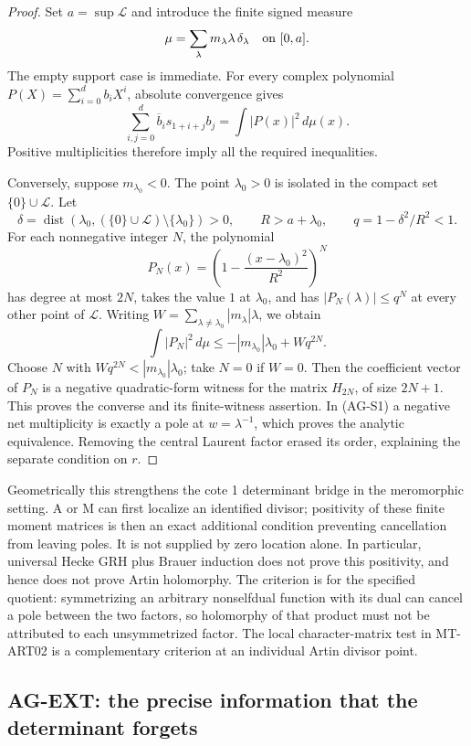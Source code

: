 \begin{proof}
Set $a=\sup\mathcal L$ and introduce the finite signed measure
\[
 \mu=\sum_\lambda m_\lambda\lambda\,\delta_\lambda
 \quad\hbox{on }[0,a].
\]
The empty support case is immediate. For every complex polynomial
$P(X)=\sum_{i=0}^d b_iX^i$, absolute convergence gives
\[
 \sum_{i,j=0}^d\overline b_i s_{1+i+j}b_j
       =\int |P(x)|^2\,d\mu(x).
\]
Positive multiplicities therefore imply all the required inequalities.

Conversely, suppose $m_{\lambda_0}<0$. The point $\lambda_0>0$ is
isolated in the compact set $\{0\}\cup\mathcal L$. Let
\[
 \delta=\operatorname{dist}
   (\lambda_0,(\{0\}\cup\mathcal L)\setminus\{\lambda_0\})>0,
 \qquad R>a+\lambda_0,
 \qquad q=1-\delta^2/R^2<1.
\]
For each nonnegative integer $N$, the polynomial
\[
 P_N(x)=\left(1-\frac{(x-\lambda_0)^2}{R^2}\right)^N
\]
has degree at most $2N$, takes the value $1$ at $\lambda_0$, and has
$|P_N(\lambda)|\le q^N$ at every other point of $\mathcal L$.
Writing $W=\sum_{\lambda\ne\lambda_0}|m_\lambda|\lambda$, we obtain
\[
 \int |P_N|^2\,d\mu
   \le -|m_{\lambda_0}|\lambda_0+Wq^{2N}.
\]
Choose $N$ with $Wq^{2N}<|m_{\lambda_0}|\lambda_0$; take $N=0$
if $W=0$. Then the coefficient vector of $P_N$ is a negative
quadratic-form witness for the matrix $H_{2N}$, of size $2N+1$.
This proves the converse and its finite-witness assertion. In (AG-S1)
a negative net multiplicity is exactly a pole at $w=\lambda^{-1}$,
which proves the analytic equivalence. Removing the central Laurent
factor erased its order, explaining the separate condition on $r$.
\end{proof}

Geometrically this strengthens the cote 1 determinant bridge in the
meromorphic setting. A or M can first localize an identified divisor;
positivity of these finite moment matrices is then an exact additional
condition preventing cancellation from leaving poles. It is not supplied
by zero location alone. In particular, universal Hecke GRH plus Brauer
induction does not prove this positivity, and hence does not prove Artin
holomorphy. The criterion is for the specified quotient: symmetrizing
an arbitrary nonselfdual function with its dual can cancel a pole between
the two factors, so holomorphy of that product must not be attributed to
each unsymmetrized factor. The local character-matrix test in MT-ART02
is a complementary criterion at an individual Artin divisor point.

\subsection{AG-EXT: the precise information that the determinant forgets}
\label{ag:ext}

